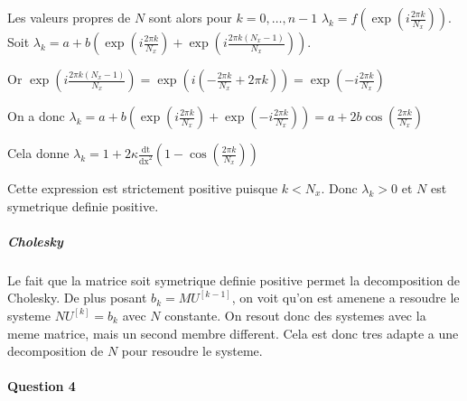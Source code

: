 \documentclass{article}
\newcommand{\dx}{\mathrm{dx}}
\newcommand{\dt}{\mathrm{dt}}
\begin{document}
Les valeurs propres de $N$ sont alors pour $k=0,\dots,n-1$ $\lambda_k=f\left(\exp\left(i\frac{2\pi k}{N_x}\right)\right)$.
Soit $\lambda_k=a+b\left(\exp\left(i\frac{2\pi k}{N_x}\right)+\exp\left(i\frac{2\pi k(N_x-1)}{N_x}\right)\right)$.

Or $\exp\left(i\frac{2\pi k(N_x-1)}{N_x}\right)=\exp\left(i(-\frac{2\pi k}{N_x}+2\pi k)\right)=\exp\left(-i\frac{2\pi k}{N_x}\right)$

On a donc $\lambda_k=a+b\left(\exp\left(i\frac{2\pi k}{N_x}\right)+\exp\left(-i\frac{2\pi k}{N_x}\right)\right)=a+2b\cos(\frac{2\pi k}{N_x})$

Cela donne $\lambda_k = 1 + 2\kappa\frac{\dt}{\dx^2}\left(1-\cos\left(\frac{2\pi k}{N_x}\right)\right)$

Cette expression est strictement positive puisque $k < N_x$. Donc $\lambda_k > 0$ et $N$ est symetrique definie positive.

\subparagraph{Cholesky} Le fait que la matrice soit symetrique definie positive permet la decomposition de Cholesky. De plus posant $b_k=MU^{[k
-1]}$, on voit qu'on est amenene a resoudre le systeme $NU^{[k]}=b_k$ avec $N$ constante. On resout donc des systemes avec la meme matrice, mais un second membre different. Cela est donc tres adapte a une decomposition de $N$ pour resoudre le systeme.

\paragraph{Question 4}
\end{document}
